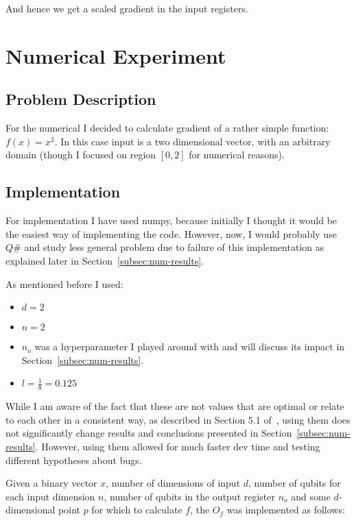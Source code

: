 \documentclass{article}
\begin{document}
And hence we get a scaled gradient in the input registers.

\section{Numerical Experiment}
\label{sec:num-exp}
\subsection{Problem Description}
For the numerical I decided to calculate gradient of a rather simple function: $f(x) = x^2$.
In this case input is a two dimensional vector, with an arbitrary domain (though I focused on region $[0, 2]$ for numerical reasons).

\subsection{Implementation}
For implementation I have used numpy, because initially I thought it would be the easiest way of implementing the code.
However, now, I would probably use $Q\#$ and study less general problem due to failure of this implementation as explained later in
Section~\ref{subsec:num-results}.

As mentioned before I used:
\begin{itemize}
    \item $d = 2$
    \item $n = 2$
    \item $n_o$ was a hyperparameter I played around with and will discuss its impact in Section~\ref{subsec:num-results}.
    \item $l = \frac{1}{8} = 0.125$
\end{itemize}

While I am aware of the fact that these are not values that are optimal or relate to each other in a consistent way,
as described in Section 5.1 of~\cite{Gily_n_2019}, using them does not significantly change results and conclusions
presented in Section~\ref{subsec:num-results}. However, using them allowed for much faster dev time and testing different
hypotheses about bugs.

Given a binary vector $x$, number of dimensions of input $d$, number of qubits for each input dimension $n$,
number of qubits in the output register $n_o$ and some $d$-dimensional point $p$ for which to calculate $f$,
the $O_f$ was implemented as follows:
\end{document}
